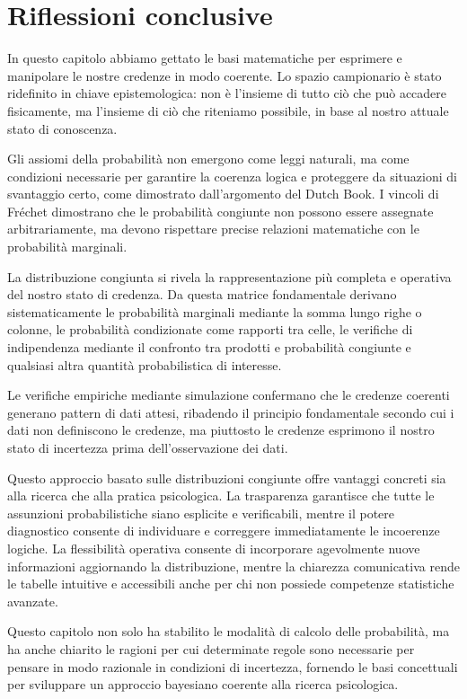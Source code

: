 \documentclass[
  letterpaper,
  DIV=11,
  numbers=noendperiod,
  oneside]{scrreprt}
\theoremstyle{definition}
\theoremstyle{plain}
\theoremstyle{definition}
\theoremstyle{remark}
\begin{document}
\section*{Riflessioni conclusive}\label{riflessioni-conclusive-1}


In questo capitolo abbiamo gettato le basi matematiche per esprimere e
manipolare le nostre credenze in modo coerente. Lo spazio campionario è
stato ridefinito in chiave epistemologica: non è l'insieme di tutto ciò
che può accadere fisicamente, ma l'insieme di ciò che riteniamo
possibile, in base al nostro attuale stato di conoscenza.

Gli assiomi della probabilità non emergono come leggi naturali, ma come
condizioni necessarie per garantire la coerenza logica e proteggere da
situazioni di svantaggio certo, come dimostrato dall'argomento del Dutch
Book. I vincoli di Fréchet dimostrano che le probabilità congiunte non
possono essere assegnate arbitrariamente, ma devono rispettare precise
relazioni matematiche con le probabilità marginali.

La distribuzione congiunta si rivela la rappresentazione più completa e
operativa del nostro stato di credenza. Da questa matrice fondamentale
derivano sistematicamente le probabilità marginali mediante la somma
lungo righe o colonne, le probabilità condizionate come rapporti tra
celle, le verifiche di indipendenza mediante il confronto tra prodotti e
probabilità congiunte e qualsiasi altra quantità probabilistica di
interesse.

Le verifiche empiriche mediante simulazione confermano che le credenze
coerenti generano pattern di dati attesi, ribadendo il principio
fondamentale secondo cui i dati non definiscono le credenze, ma
piuttosto le credenze esprimono il nostro stato di incertezza prima
dell'osservazione dei dati.

Questo approccio basato sulle distribuzioni congiunte offre vantaggi
concreti sia alla ricerca che alla pratica psicologica. La trasparenza
garantisce che tutte le assunzioni probabilistiche siano esplicite e
verificabili, mentre il potere diagnostico consente di individuare e
correggere immediatamente le incoerenze logiche. La flessibilità
operativa consente di incorporare agevolmente nuove informazioni
aggiornando la distribuzione, mentre la chiarezza comunicativa rende le
tabelle intuitive e accessibili anche per chi non possiede competenze
statistiche avanzate.

Questo capitolo non solo ha stabilito le modalità di calcolo delle
probabilità, ma ha anche chiarito le ragioni per cui determinate regole
sono necessarie per pensare in modo razionale in condizioni di
incertezza, fornendo le basi concettuali per sviluppare un approccio
bayesiano coerente alla ricerca psicologica.
\end{document}
